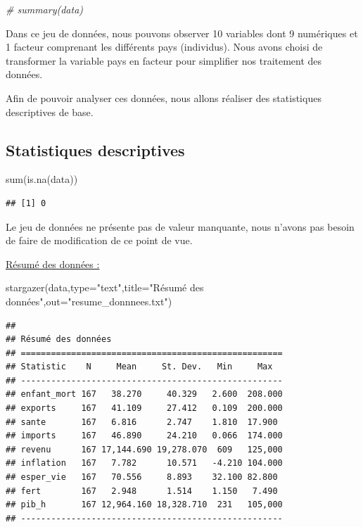\documentclass[
]{article}
\newenvironment{Shaded}{\begin{snugshade}}{\end{snugshade}}
\newcommand{\AttributeTok}[1]{\textcolor[rgb]{0.77,0.63,0.00}{#1}}
\newcommand{\CommentTok}[1]{\textcolor[rgb]{0.56,0.35,0.01}{\textit{#1}}}
\newcommand{\FunctionTok}[1]{\textcolor[rgb]{0.00,0.00,0.00}{#1}}
\newcommand{\NormalTok}[1]{#1}
\newcommand{\StringTok}[1]{\textcolor[rgb]{0.31,0.60,0.02}{#1}}
\begin{document}
\begin{Shaded}
\begin{Highlighting}[]
\CommentTok{\# summary(data)}
\end{Highlighting}
\end{Shaded}

Dans ce jeu de données, nous pouvons observer 10 variables dont 9
numériques et 1 facteur comprenant les différents pays (individus). Nous
avons choisi de transformer la variable pays en facteur pour simplifier
nos traitement des données.

Afin de pouvoir analyser ces données, nous allons réaliser des
statistiques descriptives de base.

\hypertarget{statistiques-descriptives}{%
\subsection{Statistiques descriptives}\label{statistiques-descriptives}}

\begin{Shaded}
\begin{Highlighting}[]
\FunctionTok{sum}\NormalTok{(}\FunctionTok{is.na}\NormalTok{(data))}
\end{Highlighting}
\end{Shaded}

\begin{verbatim}
## [1] 0
\end{verbatim}

Le jeu de données ne présente pas de valeur manquante, nous n'avons pas
besoin de faire de modification de ce point de vue.

\uline{Résumé des données :}

\begin{Shaded}
\begin{Highlighting}[]
\FunctionTok{stargazer}\NormalTok{(data,}\AttributeTok{type=}\StringTok{"text"}\NormalTok{,}\AttributeTok{title=}\StringTok{"Résumé des données"}\NormalTok{,}\AttributeTok{out=}\StringTok{"resume\_donnnees.txt"}\NormalTok{)}
\end{Highlighting}
\end{Shaded}

\begin{verbatim}
## 
## Résumé des données
## ====================================================
## Statistic    N     Mean     St. Dev.   Min     Max  
## ----------------------------------------------------
## enfant_mort 167   38.270     40.329   2.600  208.000
## exports     167   41.109     27.412   0.109  200.000
## sante       167   6.816      2.747    1.810  17.900 
## imports     167   46.890     24.210   0.066  174.000
## revenu      167 17,144.690 19,278.070  609   125,000
## inflation   167   7.782      10.571   -4.210 104.000
## esper_vie   167   70.556     8.893    32.100 82.800 
## fert        167   2.948      1.514    1.150   7.490 
## pib_h       167 12,964.160 18,328.710  231   105,000
## ----------------------------------------------------
\end{verbatim}
\end{document}
